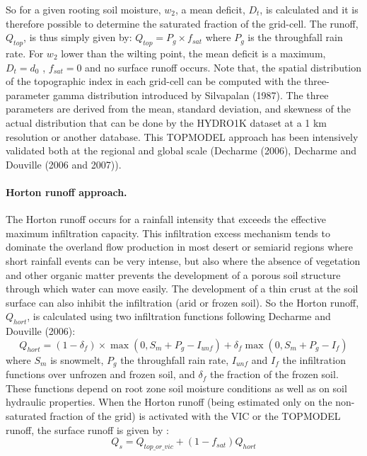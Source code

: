 So for a given rooting soil moisture, $w_2$, a mean deficit, $D_t$, is calculated and it is therefore 
possible to determine the saturated fraction of the grid-cell. The runoff, $Q_{top}$, is thus simply 
given by: $Q_{top} = P_g \times f_{sat}$  where $P_g$ is the throughfall rain rate. For $w_2$ lower than the wilting point, 
the mean deficit is a maximum, $D_t = d_0$ , $f_{sat} = 0$ and no surface runoff occurs. Note that, the 
spatial distribution of the topographic index in each grid-cell can be computed with the three-
parameter gamma distribution introduced by Silvapalan \etal (1987)\nocite{Silvapalan1987}. The three parameters 
are derived from the mean, standard deviation, and skewness of the actual distribution that 
can be done by the HYDRO1K dataset at a 1 km resolution or another database. This 
TOPMODEL approach has been intensively validated both at the regional and global scale 
(Decharme \etal (2006), Decharme and Douville (2006 and 2007)\nocite{Decharme2006a, Decharme2007}).

\paragraph{Horton runoff approach.}   The Horton runoff 
occurs for a rainfall intensity that exceeds the effective maximum infiltration capacity. This 
infiltration excess mechanism tends to dominate the overland flow production in most desert 
or semiarid regions where short rainfall events can be very intense, but also where the absence 
of vegetation and other organic matter prevents the development of a porous soil structure 
through which water can move easily. The development of a thin crust at the soil surface can 
also inhibit the infiltration (arid or frozen soil). So the Horton runoff, $Q_{hort}$, is calculated using 
two infiltration functions following Decharme and Douville (2006): 
%
\begin{equation}
		  Q_{hort} = \left(1-\delta_f \right) \times \max\left(0,S_m+ P_g -I_{unf} \right)
                             + \delta_f \max \left(0,S_m+P_g -I_f \right)
\end{equation}
%
where $S_m$ is snowmelt, $P_g$ the throughfall rain rate, $I_{unf}$ and $I_f$ the infiltration functions over 
unfrozen and frozen soil, and $\delta_f$ the fraction of the frozen soil. These functions depend on root 
zone soil moisture conditions as well as on soil hydraulic properties. When the Horton runoff (being 
estimated only on the non-saturated fraction of the grid) is activated with the VIC or the TOPMODEL 
runoff, the surface runoff is given by :
%
\begin{equation}
  Q_s = Q_{top\_or\_vic} + \left(1-f_{sat}\right) Q_{hort}
\end{equation}

